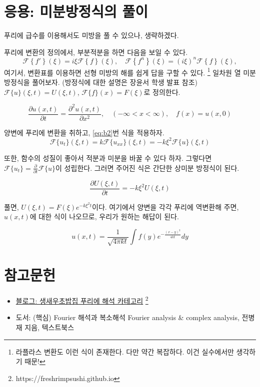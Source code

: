 \documentclass[article, oneside]{oblivoir}
\begin{document}
\section{응용: 미분방정식의 풀이}
푸리에 급수를 이용해서도 미방을 풀 수 있으나, 생략하겠다.

푸리에 변환의 정의에서, 부분적분을 하면 다음을 보일 수 있다.
\begin{equation}
    \mathcal{F}\left\{f' \right\} (\xi) = i \xi \mathcal{F}\left\{f \right\} (\xi), \quad \mathcal{F}\left\{f^n \right\} (\xi) = \left(i \xi\right)^n \mathcal{F}\left\{f \right\} (\xi), \label{eq:b2}
\end{equation}
여기서, 변환표를 이용하면 선형 미방의 해를 쉽게 답을 구할 수 있다.
\footnote{라플라스 변환도 이런 식이 존재한다. 다만 약간 복잡하다. 이건 실수에서만 생각하기 때문!}
일차원 열 미분방정식을 풀어보자. (방정식에 대한 설명은 장윤서 학생 발표 참조)
$\mathcal{F}\{u\}(\xi, t) = U(\xi, t)$, $\mathcal{F}\{f\}(x) = F(\xi)$로 정의한다.

$$\frac{\partial u(x,t)}{\partial t} = \frac{\partial^2 u(x,t)}{\partial x^2}, \quad (-\infty < x < \infty), \quad f(x) = u(x,0) $$

양변에 푸리에 변환을 취하고, \ref{eq:b2}번 식을 적용하자.
$$\mathcal{F}\{u_t\}(\xi, t) = k \mathcal{F}\{u_{xx}\}(\xi, t) =  - k \xi^2 \mathcal{F}\{u\}(\xi, t)$$

또한, 함수의 성질이 좋아서 적분과 미분을 바꿀 수 있다 하자. 그렇다면 $\mathcal{F}\{u_t\} = \frac{\partial}{\partial t}\mathcal{F}\{u\}$이 성립한다. 그러면 주어진 식은 간단한 상미분 방정식이 된다.

$$\frac{\partial U(\xi, t)}{\partial t} = - k \xi^2 U(\xi, t)$$

풀면, $U(\xi, t) = F(\xi) e^{-k \xi ^2 t}$이다. 여기에서 양변을 각각 푸리에 역변환해 주면, $u(x,t)$에 대한 식이 나오므로, 우리가 원하는 해답이 된다.

$$u(x,t) = \frac{1}{\sqrt{4 \pi k t}} \int f(y) e^{-\frac{\left(x-y\right)^2}{4 k t}} dy$$

\section{참고문헌}
\begin{itemize}
    \item \href{https://freshrimpsushi.github.io/}{블로그: 생새우초밥집 \> 푸리에 해석 카테고리} \footnote{https://freshrimpsushi.github.io}
    \item 도서: (핵심) Fourier 해석과 복소해석 Fourier analysis \& complex analysis, 전병재 지음, 텍스트북스
\end{itemize}
\end{document}
